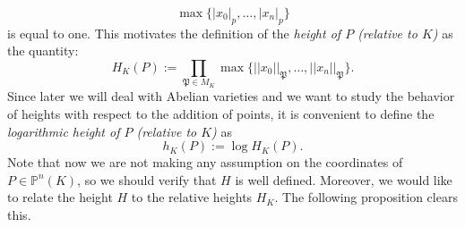 \documentclass[a4paper, 12pt]{amsart}
\theoremstyle{definition}
\theoremstyle{plain}
\theoremstyle{plain}
\theoremstyle{plain}
\theoremstyle{plain}
\theoremstyle{remark}
\theoremstyle{remark}
\theoremstyle{plain}
\renewcommand{\P}{\mathfrak{P}}
\begin{document}
	\begin{equation*}
		\max\{|x_0|_p,\ldots,|x_n|_p\}
	\end{equation*}
	is equal to one. This motivates the definition of the \emph{height of $P$ (relative to $K$)} as the quantity:
	\begin{equation*}
		H_K(P):=\prod_{\P\in M_K}\max\{||x_0||_\P,\ldots,||x_n||_\P\}.
	\end{equation*}
	Since later we will deal with Abelian varieties and we want to study the behavior of heights with respect to the addition of points, it is convenient to define the \emph{logarithmic height of $P$ (relative to $K$)} as
	\begin{equation*}
		h_K(P):=\log H_K(P).
	\end{equation*}
	Note that now we are not making any assumption on the coordinates of $P\in\mathbb{P}^n(K)$, so we should verify that $H$ is well defined. Moreover, we would like to relate the height $H$ to the relative heights $H_K$. The following proposition clears this.
\end{document}
